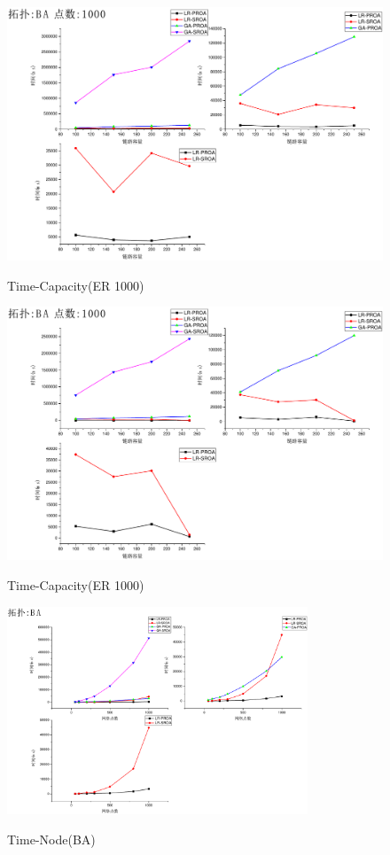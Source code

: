 \begin{figure}
\setlength{\belowcaptionskip}{-0.1cm}
\begin{center}
{\includegraphics[width=0.8 \textwidth]{figures/TI-ER-CA-1000.pdf}}
\end{center}
\caption{{\footnotesize{Time-Capacity(ER 1000)}}}
\label{TI-ER-CA-1000}
\end{figure}
\begin{figure}
\setlength{\belowcaptionskip}{-0.1cm}
\begin{center}
{\includegraphics[width=0.8 \textwidth]{figures/TI-BA-CA-1000.pdf}}
\end{center}
\caption{{\footnotesize{Time-Capacity(ER 1000)}}}
\label{TI-BA-CA-1000}
\end{figure}
\begin{figure}
\setlength{\belowcaptionskip}{-0.1cm}
\begin{center}
{\includegraphics[width=0.8\textwidth]{figures/TI-BA-NO.pdf}}
\end{center}
\caption{{\footnotesize{Time-Node(BA)}}}
\label{TI-BA-NO}
\end{figure}
